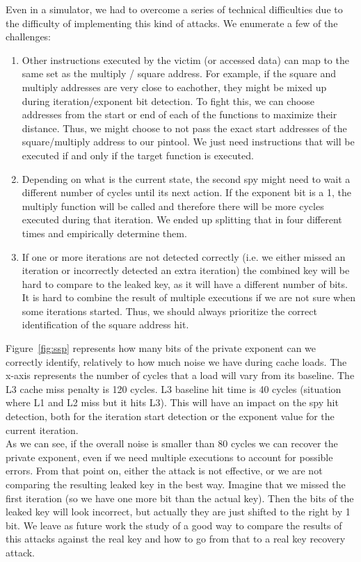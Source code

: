 \documentclass[12pt]{article}
\begin{document}
Even in a simulator, we had to overcome a series of technical difficulties due to the difficulty of implementing this kind of attacks. We enumerate a few of the challenges:
\begin{enumerate}
    \item Other instructions executed by the victim (or accessed data) can map to the same set as the multiply / square address. For example, if the square and multiply addresses are very close to eachother, they might be mixed up during iteration/exponent bit detection. To fight this, we can choose addresses from the start or end of each of the functions to maximize their distance. Thus, we might choose to not pass the exact start addresses of the square/multiply address to our pintool. We just need instructions that will be executed if and only if the target function is executed.
    \item Depending on what is the current state, the second spy might need to wait a different number of cycles until its next action. If the exponent bit is a 1, the multiply function will be called and therefore there will be more cycles executed during that iteration. We ended up splitting that in four different times and empirically determine them.
    \item If one or more iterations are not detected correctly (i.e. we either missed an iteration or incorrectly detected an extra iteration) the combined key will be hard to compare to the leaked key, as it will have a different number of bits. It is hard to combine the result of multiple executions if we are not sure when some iterations started. Thus, we should always prioritize the correct identification of the square address hit.
\end{enumerate}


Figure~\ref{fig:ssp} represents how many bits of the private exponent can we correctly identify, relatively to how much noise we have during cache loads. 
The x-axis represents the number of cycles that a load will vary from its baseline. The L3 cache miss penalty is 120 cycles. L3 baseline hit time is 40 cycles (situation where L1 and L2 miss but it hits L3). This will have an impact on the spy hit detection, both for the iteration start detection or the exponent value for the current iteration. \\

As we can see, if the overall noise is smaller than 80 cycles we can recover the private exponent, even if we need multiple executions to account for possible errors. From that point on, either the attack is not effective, or we are not comparing the resulting leaked key in the best way. Imagine that we missed the first iteration (so we have one more bit than the actual key). Then the bits of the leaked key will look incorrect, but actually they are just shifted to the right by 1 bit. We leave as future work the study of a good way to compare the results of this attacks against the real key and how to go from that to a real key recovery attack.
\end{document}
